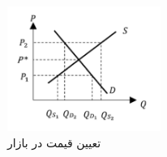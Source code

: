  \begin{figure}[H]
	\includegraphics[width=5cm]{../Figure/introduction/market_price.png}
	\centering
	\caption{تعیین قیمت در بازار}
	\label{fig:market_price}
\end{figure}


